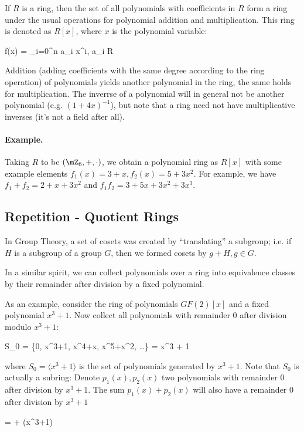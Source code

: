 If $R$ is a ring, then the set of all polynomials with coefficients in $R$ form a ring under the usual operations for polynomial addition and multiplication. This ring is denoted as $R[x]$, where $x$ is the polynomial variable:

\bee
f(x) = \sum_{i=0}^n a_i x^i, a_i \in R
\eee

Addition (adding coefficients with the same degree according to the ring operation) of polynomials yields another polynomial in the ring, the same holds for multiplication. The inverrse of a polynomial will in general not be another polynomial (e.g. $(1 + 4x)^{-1}$), but note that a ring need not have multiplicative inverses (it's not a field after all).

\paragraph{Example.} Taking $R$ to be $(\mZ_6, +, \cdot)$, we obtain a polynomial ring as $R[x]$ with some example elements $f_1(x) = 3 + x, f_2(x) = 5 + 3x^2$. For example, we have $f_1 + f_2 = 2 + x + 3x^2$ and $f_1 f_2 = 3 + 5x + 3x^2 + 3x^3$.

\subsection{Repetition - Quotient Rings}

In Group Theory, a set of cosets was created by ``translating'' a subgroup; i.e. if $H$ is a subgroup of a group $G$, then we formed cosets by $g + H, g \in G$.

In a similar spirit, we can collect polynomials over a ring into equivalence classes by their remainder after division by a fixed polynomial.

As an example, consider the ring of polynomials $GF(2)[x]$ and a fixed polynomial $x^3+1$. Now collect all polynomials with remainder $0$ after division modulo $x^3+1$:

\bee
S_0 = \{0, x^3+1, x^4+x, x^5+x^2, \ldots\} = \langle x^3 + 1 \rangle
\eee

where $S_0 = \langle x^3 + 1 \rangle$ is the set of polynomials generated by $x^3+1$. Note that $S_0$ is actually a subring: Denote $p_1(x), p_2(x)$ two polynomials with remainder $0$ after division by $x^3+1$. The sum $p_1(x) + p_2(x)$ will also have a remainder $0$ after division by $x^3+1$

\bee
{} =  +   \bmod (x^3+1)
\eee

